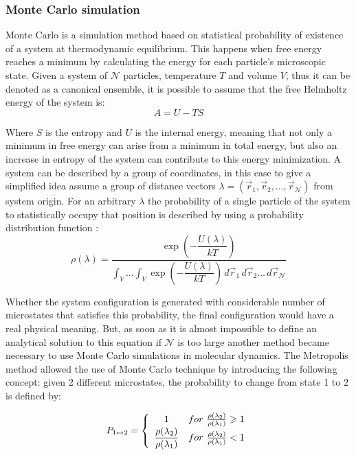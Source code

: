 \documentclass[10pt,a4paper,twoside]{article}
\begin{document}
\subsubsection*{Monte Carlo simulation}
Monte Carlo is  a simulation method based on statistical probability of existence of a system at thermodynamic equilibrium. This happens when free energy reaches a minimum by calculating the energy for each particle's microscopic state. Given a system of $ \mathcal{N}$ particles, temperature $T$ and volume $V$, thus it can be denoted as a canonical ensemble, it is possible to assume that  the free Helmholtz energy of the system is:
\begin{equation}
A = U - TS
\label{eqn:freeE}
\end{equation}

Where $S$ is the entropy and $U$ is the internal energy, meaning that not only a minimum in free energy can arise from a minimum in total energy, but also an increase in entropy of the system can contribute to this energy minimization. A system can be described by a group of coordinates, in this case to give a simplified idea assume a group of distance vectors $\lambda = (	\vec{r}_1,\vec{r}_2, \ldots, \vec{r}_\mathcal{N} )$ from system origin. For an arbitrary $\lambda$ the probability of a single particle of the system to statistically occupy that position is described by using a probability distribution function \cite{satoh}:
\begin{equation}
\rho(\lambda) = \dfrac{\exp{\left(-\dfrac{U(\lambda)}{kT}\right)}}{\displaystyle \int_V \dots   \int_V \exp{\left(-\dfrac{U(\lambda)}{kT}\right)}\,d\vec{r}_1 \,d\vec{r}_2 \ldots \,d\vec{r}_\mathcal{N} }
\label{eqn:rho}
\end{equation}

Whether the system configuration is generated with considerable number of microstates that satisfies this probability, the final configuration would have a real physical meaning. But, as soon as it is almost impossible to define an analytical solution to this equation if $\mathcal{N}$ is too large another method became necessary to use Monte Carlo simulations in molecular dynamics. The Metropolis method \cite{metropolis} allowed the use of Monte Carlo technique by introducing the following concept: given 2 different microstates, the probability to change from state 1 to 2 is defined by:

\begin{equation}
 P_{1\mapsto2} = \left\{
\begin{array}{c l}     
    1 & for \ \frac{\rho(\lambda_2)}{\rho(\lambda_1)}\geqslant1\\
    \dfrac{\rho(\lambda_2)}{\rho(\lambda_1)} & for \ \frac{\rho(\lambda_2)}{\rho(\lambda_1)}<1
\end{array}\right.
\label{eqn:metrop}
\end{equation}
\end{document}
